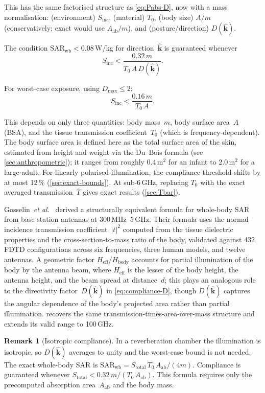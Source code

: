 \documentclass[11pt,a4paper]{article}
\theoremstyle{definition}      %
\newtheorem{remark}[remark]{Remark}
\newcommand{\khat}{\hat{\bm{k}}}
\newcommand{\Sinc}{S_{\mathrm{inc}}}
\newcommand{\Aab}{A_{\mathrm{ab}}}
\newcommand{\SARwb}{\mathrm{SAR}_{\mathrm{wb}}}
\newcommand{\Tbar}{\bar{T}}
\begin{document}
This has the same factorised structure as \cref{eq:Pabs-D}, now with a
mass normalisation: (environment) $\Sinc$, (material) $T_0$, (body size)
$A/m$ (conservatively; exact would use $\Aab/m$), and (posture/direction)
$D(\khat)$.

The condition $\SARwb<0.08$\,W/kg for direction~$\khat$ is guaranteed
whenever
\begin{equation}\label{eq:compliance-D}
  \Sinc < \frac{0.32\,m}{T_0\,A\,D(\khat)}.
\end{equation}

For worst-case exposure, using $D_{\max}\le 2$:
\begin{equation}\label{eq:compliance-worst}
  \boxed{\Sinc < \frac{0.16\,m}{T_0\,A}.}
\end{equation}

This depends on only three quantities: body mass~$m$, body surface
area~$A$ (BSA), and the tissue transmission coefficient~$T_0$ (which is
frequency-dependent).  The body surface area is defined here as the total
surface area of the skin, estimated from height and weight via the
Du~Bois formula (see \cref{sec:anthropometric}); it ranges from
roughly $0.4$\,m$^2$ for an infant to $2.0$\,m$^2$ for a large adult.
For linearly polarised illumination, the
compliance threshold shifts by at most 12\,\%
(\cref{sec:exact-bounds}).  At sub-6\,GHz, replacing $T_0$ with the
exact averaged transmission~$\Tbar$ gives exact results
(\cref{sec:Tbar}).

Gosselin~\textit{et al.}~\cite{Gosselin2011} derived a structurally equivalent
formula for whole-body SAR from base-station antennas at 300\,MHz--5\,GHz.
Their formula uses the normal-incidence transmission coefficient~$|t|^2$
computed from the tissue dielectric properties and
the cross-section-to-mass ratio of the body, validated against 432 FDTD
configurations across six frequencies, three human models, and twelve antennas.
A geometric factor $H_{\mathrm{eff}}/H_{\mathrm{body}}$ accounts for
partial illumination of the body by the antenna beam, where $H_{\mathrm{eff}}$
is the lesser of the body height, the antenna height, and the beam spread
at distance~$d$; this plays an analogous role to the directivity
factor~$D(\khat)$ in \cref{eq:compliance-D}, though $D(\khat)$ captures
the angular dependence of the body's projected area rather than partial
illumination.
 recovers the same transmission-times-area-over-mass
structure and extends its valid range to 100\,GHz.

\begin{remark}[Isotropic compliance]
In a reverberation chamber the illumination is isotropic, so
$D(\khat)$ averages to unity and the worst-case bound is not needed.
The exact whole-body SAR is $\SARwb = S_{\mathrm{total}}\,T_0\,\Aab/(4m)$.
Compliance is guaranteed whenever
$S_{\mathrm{total}} < 0.32\,m/(T_0\,\Aab)$.  This formula requires
only the precomputed absorption area~$\Aab$ and the body mass.
\end{remark}
\end{document}
